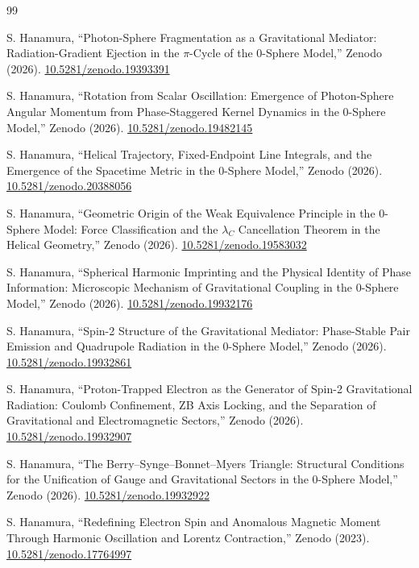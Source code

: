 \documentclass[%
 reprint, amsmath,amssymb, aps, prb, ]{revtex4-2}
\numberwithin{equation}{section}
\begin{document}
\begin{thebibliography}{99}

 S. Hanamura, ``Photon-Sphere Fragmentation as a Gravitational Mediator: Radiation-Gradient Ejection in the $\pi$-Cycle of the 0-Sphere Model,'' Zenodo (2026). \href{https://doi.org/10.5281/zenodo.19393391}{10.5281/zenodo.19393391}

 S. Hanamura, ``Rotation from Scalar Oscillation: Emergence of Photon-Sphere Angular Momentum from Phase-Staggered Kernel Dynamics in the 0-Sphere Model,'' Zenodo (2026). \href{https://doi.org/10.5281/zenodo.19482145}{10.5281/zenodo.19482145}

 S. Hanamura, ``Helical Trajectory, Fixed-Endpoint Line Integrals, and the Emergence of the Spacetime Metric in the 0-Sphere Model,'' Zenodo (2026). \href{https://doi.org/10.5281/zenodo.20388056}{10.5281/zenodo.20388056}

 S. Hanamura, ``Geometric Origin of the Weak Equivalence Principle in the 0-Sphere Model: Force Classification and the $\lambda_C$ Cancellation Theorem in the Helical Geometry,'' Zenodo (2026). \href{https://doi.org/10.5281/zenodo.19583032}{10.5281/zenodo.19583032}

 S. Hanamura, ``Spherical Harmonic Imprinting and the Physical Identity of Phase Information: Microscopic Mechanism of Gravitational Coupling in the 0-Sphere Model,'' Zenodo (2026). \href{https://doi.org/10.5281/zenodo.19932176}{10.5281/zenodo.19932176}

 S. Hanamura, ``Spin-2 Structure of the Gravitational Mediator: Phase-Stable Pair Emission and Quadrupole Radiation in the 0-Sphere Model,'' Zenodo (2026). \href{https://doi.org/10.5281/zenodo.19932861}{10.5281/zenodo.19932861}

 S. Hanamura, ``Proton-Trapped Electron as the Generator of Spin-2 Gravitational Radiation: Coulomb Confinement, ZB Axis Locking, and the Separation of Gravitational and Electromagnetic Sectors,'' Zenodo (2026). \href{https://doi.org/10.5281/zenodo.19932907}{10.5281/zenodo.19932907}

 S. Hanamura, ``The Berry--Synge--Bonnet--Myers Triangle: Structural Conditions for the Unification of Gauge and Gravitational Sectors in the 0-Sphere Model,'' Zenodo (2026). \href{https://doi.org/10.5281/zenodo.19932922}{10.5281/zenodo.19932922}

 S. Hanamura, ``Redefining Electron Spin and Anomalous Magnetic Moment Through Harmonic Oscillation and Lorentz Contraction,'' Zenodo (2023). \href{https://doi.org/10.5281/zenodo.17764997}{10.5281/zenodo.17764997}


\end{thebibliography}
\end{document}
